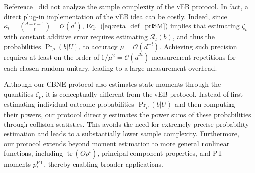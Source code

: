 \documentclass[aps,prl,twocolumn,nofootinbib,superscriptaddress,10pt]{revtex4-2}
\DeclareMathOperator{\Tr}{tr}
\theoremstyle{plain}
\theoremstyle{definition}
\newcommand{\PT}{\mathrm{PT}}
\def\eqref#1{\textup{(\ref{#1})}}
\begin{document}
Reference~\cite{PhysRevLett.108.110503} did not analyze the sample complexity of the vEB protocol. 
In fact, a direct plug-in implementation of the vEB idea can be costly.
Indeed, since $\kappa_t=\binom{d+t-1}{t}=\mathcal O(d^t)$, Eq.~\eqref{eq:zeta_def_prlSM} implies that estimating $\zeta_t$ with constant additive error requires estimating $\mathcal R_t(b)$, and thus the probabilities $\Pr_\rho(b|U)$, to accuracy $\mu=\mathcal O(d^{-t})$. 
Achieving such precision requires at least on the order of $1/\mu^2=\mathcal O(d^{2t})$ measurement repetitions for each chosen random unitary, leading to a large measurement overhead. 

    


Although our CBNE protocol also estimates state moments through the quantities $\zeta_k$, it is conceptually different from the vEB protocol. 
Instead of first estimating individual outcome probabilities $\Pr_\rho(b|U)$ and then computing their powers, our protocol directly estimates the power sums of these probabilities through collision statistics. 
This avoids the need for extremely precise probability estimation and leads to a substantially lower sample complexity. 
Furthermore, our protocol extends beyond moment estimation to more general nonlinear functions, including $\Tr(O\rho^t)$, principal component properties, and PT moments $p_t^{\PT}$, thereby enabling broader applications.
\end{document}
